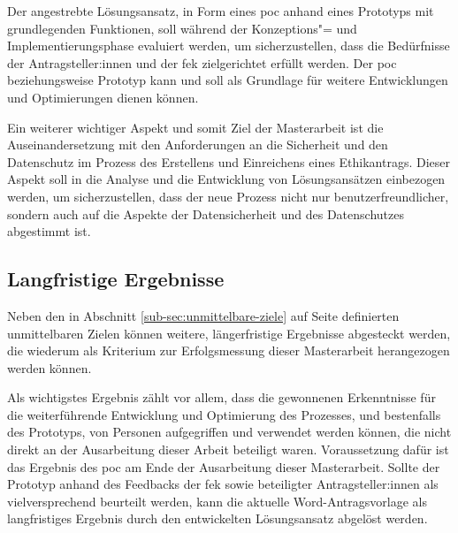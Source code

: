 \documentclass[a4paper,12pt,twoside,numbers=noendperiod]{scrreprt}
\begin{document}
Der angestrebte Lösungsansatz, in Form eines \ac{poc} anhand eines Prototyps mit grundlegenden Funktionen, soll während der Konzeptions"= und Implementierungsphase evaluiert werden, um sicherzustellen, dass die Bedürfnisse der Antragsteller:innen und der \acl{fek} zielgerichtet erfüllt werden. Der \ac{poc} beziehungsweise Prototyp kann und soll als Grundlage für weitere Entwicklungen und Optimierungen dienen können.

Ein weiterer wichtiger Aspekt und somit Ziel der Masterarbeit ist die Auseinandersetzung mit den Anforderungen an die Sicherheit und den Datenschutz im Prozess des Erstellens und Einreichens eines Ethikantrags. Dieser Aspekt soll in die Analyse und die Entwicklung von Lösungsansätzen einbezogen werden, um sicherzustellen, dass der neue Prozess nicht nur benutzerfreundlicher, sondern auch auf die Aspekte der Datensicherheit und des Datenschutzes abgestimmt ist.

\subsection{Langfristige Ergebnisse}
\label{sub-sec:langfristige-ergebnisse}

Neben den in Abschnitt \ref{sub-sec:unmittelbare-ziele} auf Seite \pageref{sub-sec:unmittelbare-ziele} definierten unmittelbaren Zielen können weitere, längerfristige Ergebnisse abgesteckt werden, die wiederum als Kriterium zur Erfolgsmessung dieser Masterarbeit herangezogen werden können.

Als wichtigstes Ergebnis zählt vor allem, dass die gewonnenen Erkenntnisse für die weiterführende Entwicklung und Optimierung des Prozesses, und bestenfalls des Prototyps, von Personen aufgegriffen und verwendet werden können, die nicht direkt an der Ausarbeitung dieser Arbeit beteiligt waren. Voraussetzung dafür ist das Ergebnis des \ac{poc} am Ende der Ausarbeitung dieser Masterarbeit. Sollte der Prototyp anhand des Feedbacks der \acl{fek} sowie beteiligter Antragsteller:innen als vielversprechend beurteilt werden, kann die aktuelle Word-Antragsvorlage als langfristiges Ergebnis durch den entwickelten Lösungsansatz abgelöst werden.

\medskip
\end{document}
